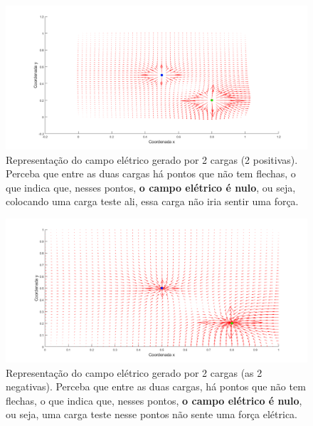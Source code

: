 \documentclass[12pt]{extarticle}
\newcommand{\<}{\langle}
\renewcommand{\>}{\rangle}
\theoremstyle{definition}
\begin{document}
 \begin{figure} [H]
     \centering
     \includegraphics[width=\linewidth]{campo_eletrico_pos_pos.png}
     \caption{Representação do campo elétrico gerado por 2 cargas (2 positivas). Perceba que entre as duas cargas há pontos que não tem flechas, o que indica que, nesses pontos, \textbf{o campo elétrico é nulo}, ou seja, colocando uma carga teste ali, essa carga não iria sentir uma força. }
     \label{fig:campo_pos_pos}
 \end{figure}
 
  \begin{figure} [H]
     \centering
     \includegraphics[width=\linewidth]{campo_eletrico_neg_neg.png}
     \caption{Representação do campo elétrico gerado por 2 cargas (as 2 negativas). Perceba que entre as duas cargas, há pontos que não tem flechas, o que indica que, nesses pontos, \textbf{o campo elétrico é nulo}, ou seja, uma carga teste nesse pontos não sente uma força elétrica.}
     \label{fig:campo_neg_neg}
 \end{figure}
 
\end{document}
